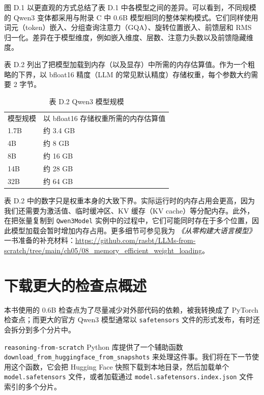 图 D.1 以更直观的方式总结了表 D.1 中各模型之间的差异。可以看到，不同规模的 Qwen3 变体都采用与附录 C 中 0.6B 模型相同的整体架构模式。它们同样使用词元（token）嵌入、分组查询注意力（GQA）、旋转位置嵌入、前馈层和 RMS 归一化。差异在于模型维度，例如嵌入维度、层数、注意力头数以及前馈隐藏维度。


表 D.2 列出了把模型加载到内存（以及显存）中所需的内存估算值。作为一个粗略的下界，以 bfloat16 精度（LLM 的常见默认精度）存储权重，每个参数大约需要 2 字节。

\begin{table}[htbp]
\centering\small
\centering
\caption{表 D.2 Qwen3 模型规模}
\begin{tabularx}{\linewidth}{XX}
\toprule
模型规模 & 以 bfloat16 存储权重所需的内存估算值 \\
1.7B & 约 3.4 GB \\
4B & 约 8 GB \\
8B & 约 16 GB \\
14B & 约 28 GB \\
32B & 约 64 GB \\ \bottomrule
\end{tabularx}
\end{table}

表 D.2 中的数字只是权重本身的大致下界。实际运行时的内存占用会更高，因为我们还需要为激活值、临时缓冲区、KV 缓存（KV cache）等分配内存。此外，在把张量复制到 \texttt{Qwen3Model} 实例中的过程中，它们可能同时存在于多个位置，因此模型加载会暂时增加内存占用。更多细节可参见我为 \emph{《从零构建大语言模型》} 一书准备的补充材料：\href{https://github.com/rasbt/LLMs-from-scratch/tree/main/ch05/08\_memory\_efficient\_weight\_loading}{https://github.com/rasbt/LLMs-from-scratch/tree/main/ch05/08\_memory\_efficient\_weight\_loading}。

\section{下载更大的检查点概述}

本书使用的 0.6B 检查点为了尽量减少对外部代码的依赖，被我转换成了 PyTorch 检查点；而更大的官方 Qwen3 模型通常以 \texttt{safetensors} 文件的形式发布，有时还会拆分到多个分片中。

\texttt{reasoning-from-scratch} Python 库提供了一个辅助函数 \texttt{download\_from\_huggingface\_from\_snapshots} 来处理这件事。我们将在下一节使用这个函数，它会把 Hugging Face 快照下载到本地目录，然后加载单个 \texttt{model.safetensors} 文件，或者加载通过 \texttt{model.safetensors.index.json} 文件索引的多个分片。

